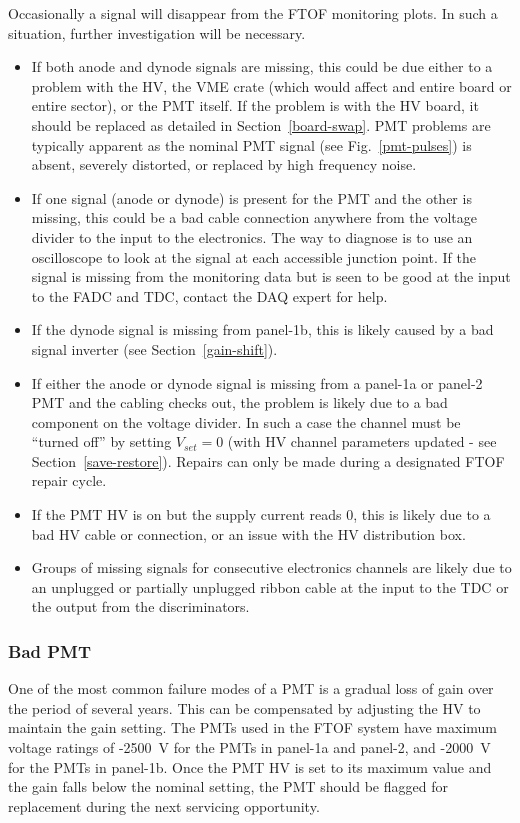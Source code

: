 \documentclass[12pt]{article}
\begin{document}
Occasionally a signal will disappear from the FTOF monitoring plots. In such a situation, 
further investigation will be necessary. 

\begin{itemize}
\item If both anode and dynode signals are missing, this could be due either to a problem 
with the HV, the VME crate (which would affect and entire board or entire sector), or the 
PMT itself. If the problem is with the HV board, it should be replaced as detailed in 
Section~\ref{board-swap}. PMT problems are typically apparent as the nominal PMT signal 
(see Fig.~\ref{pmt-pulses}) is absent, severely distorted, or replaced by high frequency 
noise.
\item If one signal (anode or dynode) is present for the PMT and the other is missing, 
this could be a bad cable connection anywhere from the voltage divider to the input to 
the electronics. The way to diagnose is to use an oscilloscope to look at the signal at 
each accessible junction point. If the signal is missing from the monitoring data but is 
seen to be good at the input to the FADC and TDC, contact the DAQ expert for help.
\item If the dynode signal is missing from panel-1b, this is likely caused by a bad 
signal inverter (see Section~\ref{gain-shift}).
\item If either the anode or dynode signal is missing from a panel-1a or panel-2 PMT and 
the cabling checks out, the problem is likely due to a bad component on the voltage 
divider. In such a case the channel must be ``turned off'' by setting $V_{set}=0$ (with 
HV channel parameters updated - see Section~\ref{save-restore}). Repairs can only be 
made during a designated FTOF repair cycle.
\item If the PMT HV is on but the supply current reads 0, this is likely due to a bad 
HV cable or connection, or an issue with the HV distribution box.
\item Groups of missing signals for consecutive electronics channels are likely due to
an unplugged or partially unplugged ribbon cable at the input to the TDC or the output 
from the discriminators.
\end{itemize}

\subsubsection{Bad PMT}
\label{bad-pmt}

One of the most common failure modes of a PMT is a gradual loss of gain over the period 
of several years. This can be compensated by adjusting the HV to maintain the gain 
setting. The PMTs used in the FTOF system have maximum voltage ratings of -2500~V for 
the PMTs in panel-1a and panel-2, and -2000~V for the PMTs in panel-1b. Once the PMT HV 
is set to its maximum value and the gain falls below the nominal setting, the PMT should 
be flagged for replacement during the next servicing opportunity.
\end{document}
